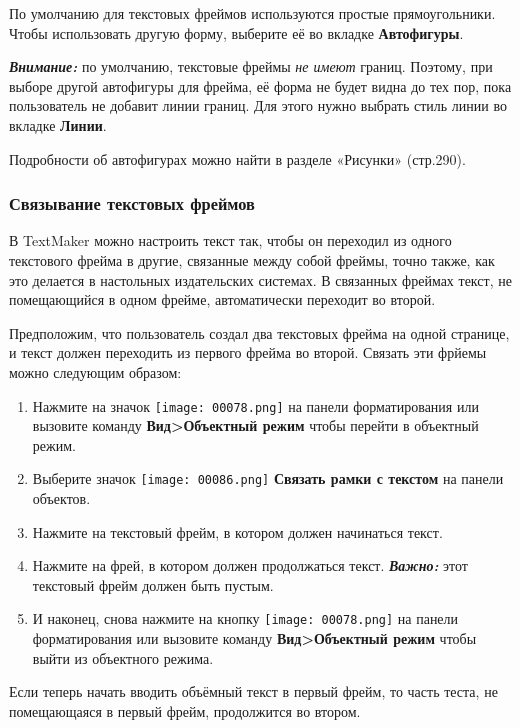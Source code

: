 ﻿\documentclass[a4paper,10pt]{article}
\begin{document}
По умолчанию для текстовых фреймов используются простые прямоугольники. Чтобы использовать другую форму, выберите её во вкладке \textbf{Автофигуры}.

\begin{mdframed}[backgroundcolor=blue!10]
\textbf{\textit{Внимание:}} по умолчанию,  текстовые фреймы \textit{не имеют} границ. Поэтому, при выборе другой автофигуры для фрейма, её форма не будет видна до тех пор, пока пользователь не добавит линии границ. Для этого нужно выбрать стиль линии во вкладке \textbf{Линии}.
\end{mdframed}

Подробности об автофигурах можно найти в разделе «Рисунки» (стр.290).

\subsubsection{Связывание текстовых фреймов}
В TextMaker можно настроить текст так, чтобы он переходил из одного текстового фрейма в другие, связанные между собой фреймы, точно также, как это делается в настольных издательских системах. В связанных фреймах текст, не помещающийся в одном фрейме, автоматически переходит во второй.

Предположим, что пользователь создал два текстовых фрейма на одной странице, и текст должен переходить из первого фрейма во второй. Связать эти фрйемы можно следующим образом:

\begin{enumerate}
 \item Нажмите на значок \texttt{[image: 00078.png]} на панели форматирования или вызовите команду \textbf{Вид>Объектный режим} чтобы перейти в объектный режим.
 \item Выберите значок \texttt{[image: 00086.png]} \textbf{Связать рамки с текстом} на панели объектов.
 \item Нажмите на текстовый фрейм, в котором должен начинаться текст.
 \item Нажмите на фрей, в котором должен продолжаться текст. \textit{\textbf{Важно:}} этот текстовый фрейм должен быть пустым.
 \item И наконец, снова нажмите на кнопку \texttt{[image: 00078.png]} на панели форматирования или вызовите команду \textbf{Вид>Объектный режим} чтобы выйти из объектного режима.
\end{enumerate}

Если теперь начать вводить объёмный текст в первый фрейм, то часть теста, не помещающаяся в первый фрейм, продолжится во втором.
\end{document}
